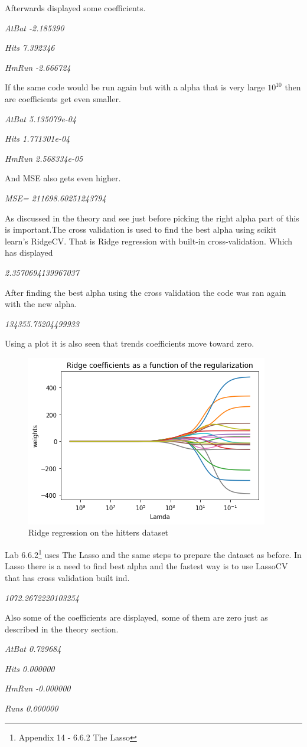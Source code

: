 Afterwards displayed some coefficients.

\noindent\textit{AtBat  -2.185390}

\noindent\textit{Hits    7.392346}

\noindent\textit{HmRun  -2.666724}

If the same code would be run again but with a alpha that is very large $10^10$ then are coefficients get even smaller.

\noindent\textit{AtBat  5.135079e-04}

\noindent\textit{Hits    1.771301e-04}

\noindent\textit{HmRun  2.568334e-05}

And  MSE also gets even higher.

\noindent\textit{MSE= 211698.60251243794}

As discussed in the theory and see just before picking the right alpha part of this is important.The cross validation is used to find the best alpha using scikit learn's RidgeCV. That is Ridge regression with built-in cross-validation. Which has displayed 

\noindent\textit{2.3570694139967037}

After finding the best alpha using the cross validation the code was ran again with the new alpha.   

\noindent\textit{134355.75204499933}

Using a plot it is also seen that trends coefficients move toward zero.
\begin{figure}[H]
	\centering
	\includegraphics[width=0.45\linewidth]{shrinkageMethods/fig/plot}
	\caption{Ridge regression on the hitters dataset}
	\label{fig:plot}
\end{figure}
Lab 6.6.2\footnote{Appendix 14 - 6.6.2 The Lasso} uses The Lasso and the same steps to prepare the dataset as before. In Lasso there is a need to find best alpha and the fastest way is to use LassoCV that has cross validation built ind.

\noindent\textit{1072.2672220103254}

Also some of the coefficients are displayed, some of them are zero just as described in the theory section.

\noindent\textit{AtBat          0.729684}

\noindent\textit{Hits           0.000000}

\noindent\textit{HmRun         -0.000000}

\noindent\textit{Runs           0.000000}